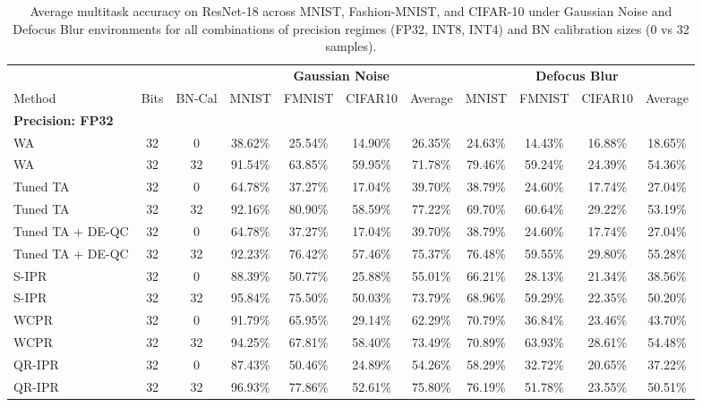 \documentclass{article}
\theoremstyle{plain}
\theoremstyle{definition}
\theoremstyle{remark}
\begin{document}
\begin{table}[htbp]
\caption{Average multitask accuracy on ResNet-18 across MNIST, Fashion-MNIST, and CIFAR-10 under Gaussian Noise and Defocus Blur environments for all combinations of precision regimes (FP32, INT8, INT4) and BN calibration sizes (0 vs 32 samples).}
\label{tab:robustness_results}
\begin{center}
\setlength{\tabcolsep}{4pt}
\begin{scriptsize}
\begin{sc}
\begin{tabular}{lcccccccccc}
\toprule
 & & & \multicolumn{4}{c}{\textbf{Gaussian Noise}} & \multicolumn{4}{c}{\textbf{Defocus Blur}} \\
\cmidrule(r){4-7} \cmidrule(l){8-11}
Method & Bits & BN-Cal & MNIST & FMNIST & CIFAR10 & Average & MNIST & FMNIST & CIFAR10 & Average \\
\midrule
\textbf{Precision: FP32} & & & & & & & & & & \\
WA & 32 & 0 & 38.62\% & 25.54\% & 14.90\% & 26.35\% & 24.63\% & 14.43\% & 16.88\% & 18.65\% \\
WA & 32 & 32 & 91.54\% & 63.85\% & 59.95\% & 71.78\% & 79.46\% & 59.24\% & 24.39\% & 54.36\% \\
Tuned TA & 32 & 0 & 64.78\% & 37.27\% & 17.04\% & 39.70\% & 38.79\% & 24.60\% & 17.74\% & 27.04\% \\
Tuned TA & 32 & 32 & 92.16\% & 80.90\% & 58.59\% & 77.22\% & 69.70\% & 60.64\% & 29.22\% & 53.19\% \\
Tuned TA + DE-QC & 32 & 0 & 64.78\% & 37.27\% & 17.04\% & 39.70\% & 38.79\% & 24.60\% & 17.74\% & 27.04\% \\
Tuned TA + DE-QC & 32 & 32 & 92.23\% & 76.42\% & 57.46\% & 75.37\% & 76.48\% & 59.55\% & 29.80\% & 55.28\% \\
S-IPR & 32 & 0 & 88.39\% & 50.77\% & 25.88\% & 55.01\% & 66.21\% & 28.13\% & 21.34\% & 38.56\% \\
S-IPR & 32 & 32 & 95.84\% & 75.50\% & 50.03\% & 73.79\% & 68.96\% & 59.29\% & 22.35\% & 50.20\% \\
WCPR & 32 & 0 & 91.79\% & 65.95\% & 29.14\% & 62.29\% & 70.79\% & 36.84\% & 23.46\% & 43.70\% \\
WCPR & 32 & 32 & 94.25\% & 67.81\% & 58.40\% & 73.49\% & 70.89\% & 63.93\% & 28.61\% & 54.48\% \\
QR-IPR & 32 & 0 & 87.43\% & 50.46\% & 24.89\% & 54.26\% & 58.29\% & 32.72\% & 20.65\% & 37.22\% \\
QR-IPR & 32 & 32 & 96.93\% & 77.86\% & 52.61\% & 75.80\% & 76.19\% & 51.78\% & 23.55\% & 50.51\% \\

\end{tabular}
\end{sc}
\end{scriptsize}
\end{center}
\end{table}
\end{document}
